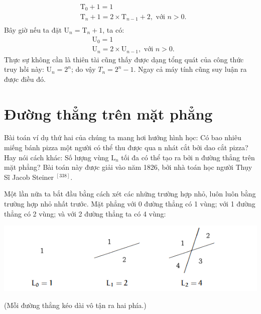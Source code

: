 \begin{equation*}
    \begin{aligned}
        & \mathrm{T}_0 + 1 = 1 \\
        & \mathrm{T}_n + 1 = 2 \times \mathrm{T}_{n - 1} + 2, \text{ \ \ \ \ với } n > 0. \\ 
    \end{aligned}
\end{equation*}
Bây giờ nếu ta đặt $\mathrm{U}_n = \mathrm{T}_n + 1$, ta có:
\begin{equation}\label{1.3}
    \begin{aligned}
        & \mathrm{U}_0 = 1 \\
        & \mathrm{U}_n = 2 \times \mathrm{U}_{n - 1}, \text{ \ \ \ \ với } n > 0.
    \end{aligned}
\end{equation}
Thực sự không cần là thiên tài cũng thấy được dạng tổng quát của công thức truy hồi này: $\mathrm{U}_n = 2^n$; do vậy $T_n = 2^n - 1$. Ngay cả máy tính cũng suy luận ra được điều đó.

\section{Đường thẳng trên mặt phẳng}\label{sec:1.2}

Bài toán ví dụ thứ hai của chúng ta mang hơi hướng hình học: Có bao nhiêu miếng bánh pizza một người có thể thu được qua n nhát cắt bởi dao cắt pizza? Hay nói cách khác: Số lượng vùng $\mathrm{L}_n$ tối đa có thể tạo ra bởi n đường thẳng trên mặt phẳng? 
Bài toán này được giải vào năm 1826, bởi nhà toán học người Thụy Sĩ Jacob Steiner \href{J. Steiner, Einige Gesetze uber die Theilung der Ebene und des 5, 633. Raumes," Journal fur die reine und angewandte Mathematik 1 (1826), 349-364. Reprinted in his Gesammelte Werke, volume 1, 77-94}{$^{[338]}$}.

Một lần nữa ta bắt đầu bằng cách xét các những trường hợp nhỏ, luôn luôn bằng trường hợp nhỏ nhất trước. Mặt phẳng với 0 đường thẳng có 1 vùng; với 1 đường thẳng có 2 vùng; và với 2 đường thẳng ta có 4 vùng:
\begin{center}
    \includegraphics[width=1\textwidth]{assets/chapter1/Line Sequence.png}
\end{center}
(Mỗi đường thẳng kéo dài vô tận ra hai phía.)

